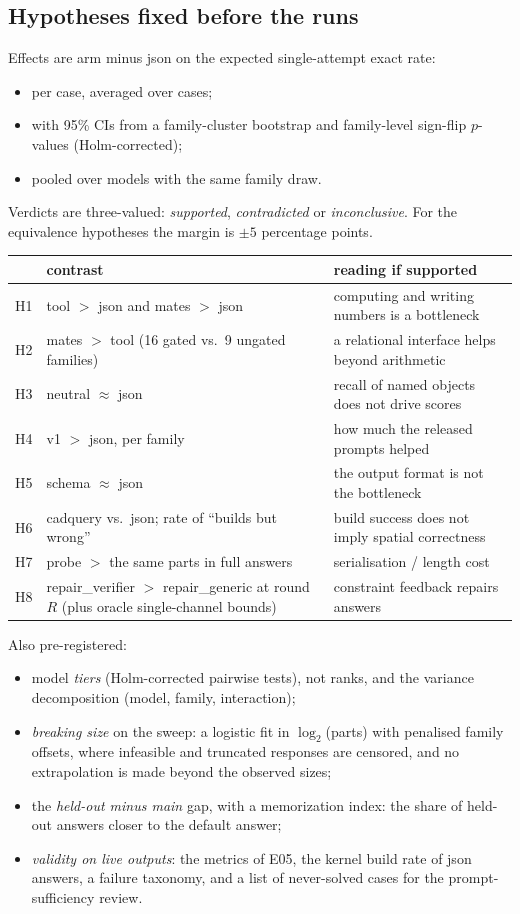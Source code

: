 \documentclass[10pt,a4paper]{article}
\begin{document}
\subsection{Hypotheses fixed before the runs}
Effects are arm minus json on the expected single-attempt exact rate:
\begin{itemize}
\item per case, averaged over cases;
\item with 95\% CIs from a family-cluster bootstrap and family-level sign-flip $p$-values (Holm-corrected);
\item pooled over models with the same family draw.
\end{itemize}
Verdicts are three-valued: \emph{supported}, \emph{contradicted} or \emph{inconclusive}. For the equivalence hypotheses the margin is $\pm5$ percentage points.
\begin{table}[h]\small
\begin{tabularx}{\linewidth}{@{}lLL@{}}
\toprule
& contrast & reading if supported \\ \midrule
H1 & tool $>$ json and mates $>$ json & computing and writing numbers is a bottleneck \\
H2 & mates $>$ tool (16 gated vs.\ 9 ungated families) & a relational interface helps beyond arithmetic \\
H3 & neutral $\approx$ json & recall of named objects does not drive scores \\
H4 & v1 $>$ json, per family & how much the released prompts helped \\
H5 & schema $\approx$ json & the output format is not the bottleneck \\
H6 & cadquery vs.\ json; rate of ``builds but wrong'' & build success does not imply spatial correctness \\
H7 & probe $>$ the same parts in full answers & serialisation / length cost \\
H8 & repair\_verifier $>$ repair\_generic at round $R$ (plus oracle single-channel bounds) & constraint feedback repairs answers \\
\bottomrule
\end{tabularx}
\end{table}

\noindent Also pre-registered:
\begin{itemize}
\item model \emph{tiers} (Holm-corrected pairwise tests), not ranks, and the variance decomposition (model, family, interaction);
\item \emph{breaking size} on the sweep: a logistic fit in $\log_2$(parts) with penalised family offsets, where infeasible and truncated responses are censored, and no extrapolation is made beyond the observed sizes;
\item the \emph{held-out minus main} gap, with a memorization index: the share of held-out answers closer to the default answer;
\item \emph{validity on live outputs}: the metrics of E05, the kernel build rate of json answers, a failure taxonomy, and a list of never-solved cases for the prompt-sufficiency review.
\end{itemize}
\end{document}
